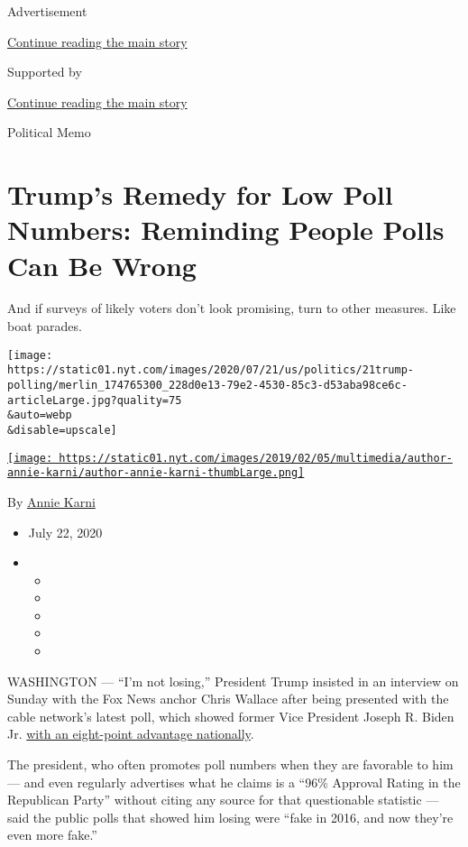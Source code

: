 Advertisement

\protect\hyperlink{after-top}{Continue reading the main story}

Supported by

\protect\hyperlink{after-sponsor}{Continue reading the main story}

Political Memo

\hypertarget{trumps-remedy-for-low-poll-numbers-reminding-people-polls-can-be-wrong}{%
\section{Trump's Remedy for Low Poll Numbers: Reminding People Polls Can
Be
Wrong}\label{trumps-remedy-for-low-poll-numbers-reminding-people-polls-can-be-wrong}}

And if surveys of likely voters don't look promising, turn to other
measures. Like boat parades.

\texttt{[image: https://static01.nyt.com/images/2020/07/21/us/politics/21trump-polling/merlin\_174765300\_228d0e13-79e2-4530-85c3-d53aba98ce6c-articleLarge.jpg?quality=75\\\&auto=webp\\\&disable=upscale]}

\href{https://www.nytimes.com/by/annie-karni}{\texttt{[image: https://static01.nyt.com/images/2019/02/05/multimedia/author-annie-karni/author-annie-karni-thumbLarge.png]}}

By \href{https://www.nytimes.com/by/annie-karni}{Annie Karni}

\begin{itemize}
\item
  July 22, 2020
\item
  \begin{itemize}
  \item
  \item
  \item
  \item
  \item
  \end{itemize}
\end{itemize}

WASHINGTON --- ``I'm not losing,'' President Trump insisted in an
interview on Sunday with the Fox News anchor Chris Wallace after being
presented with the cable network's latest poll, which showed former Vice
President Joseph R. Biden Jr.
\href{https://www.foxnews.com/politics/fox-news-poll-biden-holds-lead-over-trump-as-coronavirus-concerns-grip-nation}{with
an eight-point advantage nationally}.

The president, who often promotes poll numbers when they are favorable
to him --- and even regularly advertises what he claims is a ``96\%
Approval Rating in the Republican Party'' without citing any source for
that questionable statistic --- said the public polls that showed him
losing were ``fake in 2016, and now they're even more fake.''

